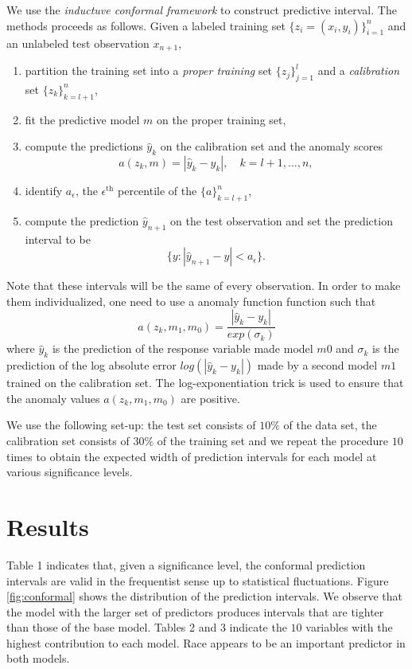 \documentclass[10pt]{amsart}%
\begin{document}
We use the \textit{inductuve conformal framework} to construct predictive interval. The methods proceeds as follows. Given a labeled training set $\{z_i = (x_i, y_i)\}_{i=1}^n$ and an unlabeled test observation $x_{n+1}$,
\begin{enumerate}
	\item partition the training set into a \textit{proper training} set $\{z_j\}_{j=1}^l$ and a \textit{calibration} set $\{z_k \}_{k=l+1}^n$,
	\item fit the predictive model $m$ on the proper training set,
	\item compute the predictions $\hat{y}_k$ on the calibration set and the anomaly scores
	$$a(z_k, m) = |\hat{y}_k - y_k|, \quad k = l+1, \dots, n,$$
	\item identify $a_\epsilon$, the $\epsilon^{\text{th}}$ percentile of the $\{a\}_{k=l+1}^n$,
	\item compute the prediction $\hat{y}_{n+1}$ on the test observation and set the prediction interval to be
	$$\{y: |\hat{y}_{n+1} - y| < a_\epsilon\}.$$
\end{enumerate}
Note that these intervals will be the same of every observation. In order to make them individualized, one need to use a anomaly function function such that
$$a(z_k, m_1, m_0) = \dfrac{|\hat{y}_k - y_k|}{exp(\sigma_k)}$$
where $\hat{y}_k$ is the prediction of the response variable made model $m0$ and $\sigma_k$ is the prediction of the log absolute error $log(|\hat{y}_k - y_k|)$ made by a second model $m1$ trained on the calibration set. The log-exponentiation trick is used to ensure that the anomaly values $a(z_k, m_1, m_0)$ are positive.

We use the following set-up: the test set consists of $10\%$ of the data set, the calibration set consists of $30\%$ of the training set and we repeat the procedure $10$ times to obtain the expected width of prediction
intervals for each model at various significance levels.



\section{Results}
\label{sec:results}

Table 1 indicates that, given a significance level, the conformal prediction intervals are valid in the frequentist sense up to statistical fluctuations. Figure \ref{fig:conformal} shows the distribution of the prediction intervals. We observe that the model with the larger set of predictors produces intervals that are tighter than those of the base model. Tables 2 and 3 indicate the $10$ variables with the highest contribution to each model. Race appears to be an important predictor in both models. 
\end{document}
